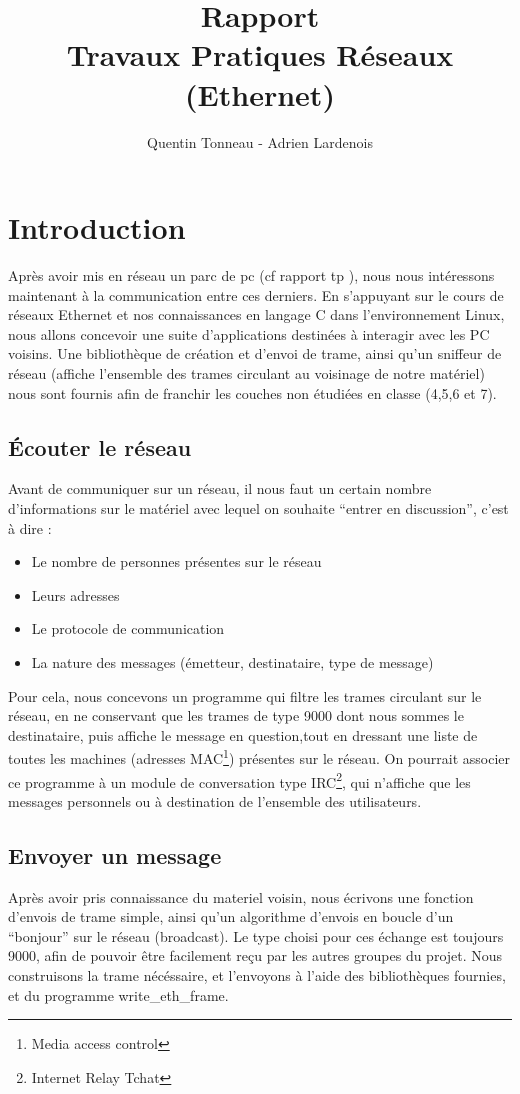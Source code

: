 \documentclass[a4paper,11pt]{article}
\title {Rapport \\ Travaux Pratiques Réseaux (Ethernet)}
\author {Quentin Tonneau - Adrien Lardenois}
\date{}
\begin{document}
	\maketitle %
	\tableofcontents %
	\newpage %
	
	
	
	
	
	
	\section{Introduction}
	Après avoir mis en réseau un parc de pc (cf rapport tp ), nous nous intéressons maintenant à la communication entre ces derniers. En s'appuyant sur le cours de réseaux Ethernet et nos connaissances en langage C dans l'environnement Linux, nous allons concevoir une suite d'applications destinées à interagir avec les PC voisins. Une bibliothèque de création et d'envoi de trame, ainsi qu'un sniffeur de réseau (affiche l'ensemble des trames circulant au voisinage de notre matériel) nous sont fournis afin de franchir les couches non étudiées en classe (4,5,6 et 7).
	\subsection{Écouter le réseau}
	Avant de communiquer sur un réseau, il nous faut un certain nombre d'informations sur le matériel avec lequel on souhaite ``entrer en discussion'', c'est à dire :
	\begin{itemize}
		\item Le nombre de personnes présentes sur le réseau
		\item Leurs adresses
		\item Le protocole de communication
		\item La nature des messages (émetteur, destinataire, type de message)
	\end{itemize}
	Pour cela, nous concevons un programme qui filtre les trames circulant sur le réseau, en ne conservant que les trames de type 9000 dont nous sommes le destinataire, puis affiche le message en question,tout en dressant une liste de toutes les machines (adresses MAC\footnote{Media access control}) présentes sur le réseau. On pourrait associer ce programme à un module de conversation type IRC\footnote{Internet Relay Tchat}, qui n'affiche que les messages personnels ou à destination de l'ensemble des utilisateurs.
	\subsection{Envoyer un message}
	Après avoir pris connaissance du materiel voisin, nous écrivons une fonction d'envois de trame simple, ainsi qu'un algorithme d'envois en boucle d'un ``bonjour'' sur le réseau (broadcast). Le type choisi pour ces échange est toujours 9000, afin de pouvoir être facilement reçu par les autres groupes du projet. Nous construisons la trame nécéssaire, et l'envoyons à l'aide des bibliothèques fournies, et du programme write\_eth\_frame.
\end{document}
